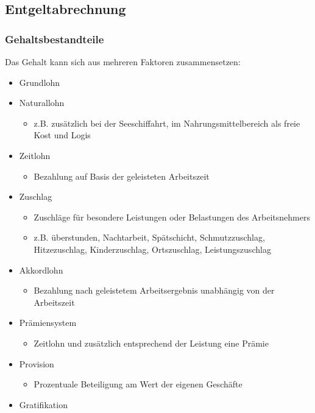 \subsection{Entgeltabrechnung}

\subsubsection{Gehaltsbestandteile} 
Das Gehalt kann sich aus mehreren Faktoren zusammensetzen:
\begin{itemize}
	\item Grundlohn
	\item Naturallohn
		\begin{itemize}
			\item z.B. zusätzlich bei der Seeschiffahrt, im Nahrungsmittelbereich als \ql freie Kost und Logis\qr\
		\end{itemize}
	\item Zeitlohn
		\begin{itemize}
			\item Bezahlung auf Basis der geleisteten Arbeitszeit
		\end{itemize}
	\item Zuschlag
		\begin{itemize}
			\item Zuschläge für besondere Leistungen oder Belastungen des Arbeitsnehmers
			\item z.B. überstunden, Nachtarbeit, Spätschicht, Schmutzzuschlag, Hitzezuschlag, Kinderzuschlag, Ortszuschlag, Leistungszuschlag
		\end{itemize}
	\item Akkordlohn
		\begin{itemize}
			\item Bezahlung nach geleistetem Arbeitsergebnis unabhängig von der Arbeitszeit
		\end{itemize}
	\item Prämiensystem
		\begin{itemize}
			\item Zeitlohn und zusätzlich entsprechend der Leistung eine Prämie
		\end{itemize}
	\item Provision
		\begin{itemize}
			 \item Prozentuale Beteiligung am Wert der eigenen Geschäfte
		\end{itemize}
	\item Gratifikation
		\begin{itemize}

\end{itemize}
\end{itemize}
